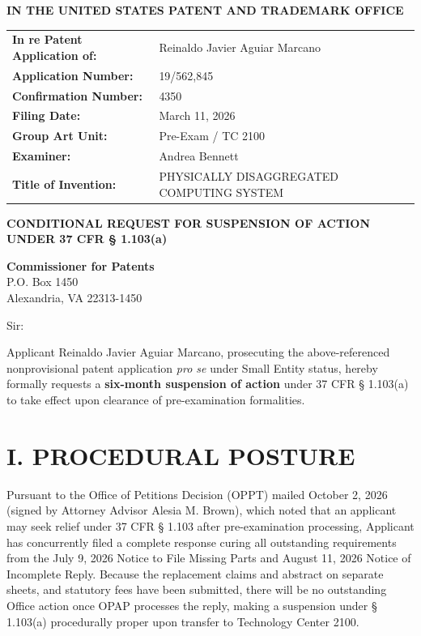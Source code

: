\documentclass[11pt,letterpaper]{article}
\begin{document}
\thispagestyle{empty}

\begin{center}
    \large\textbf{IN THE UNITED STATES PATENT AND TRADEMARK OFFICE} \\
\end{center}

\vspace{0.2cm}
\noindent\begin{tabular}{p{2.3in}p{4.0in}}
\textbf{In re Patent Application of:} & Reinaldo Javier Aguiar Marcano \\
\textbf{Application Number:} & 19/562,845 \\
\textbf{Confirmation Number:} & 4350 \\
\textbf{Filing Date:} & March 11, 2026 \\
\textbf{Group Art Unit:} & Pre-Exam / TC 2100 \\
\textbf{Examiner:} & Andrea Bennett \\
\textbf{Title of Invention:} & PHYSICALLY DISAGGREGATED COMPUTING SYSTEM \\
\end{tabular}

\vspace{0.4cm}
\begin{center}
    \textbf{\large CONDITIONAL REQUEST FOR SUSPENSION OF ACTION \\
    UNDER 37 CFR \S{} 1.103(a)}
\end{center}

\vspace{0.2cm}
\noindent\textbf{Commissioner for Patents} \\
\noindent P.O. Box 1450 \\
\noindent Alexandria, VA 22313-1450

\vspace{0.2cm}
\noindent Sir:

Applicant Reinaldo Javier Aguiar Marcano, prosecuting the above-referenced nonprovisional patent application \textit{pro se} under Small Entity status, hereby formally requests a \textbf{six-month suspension of action} under 37 CFR \S{} 1.103(a) to take effect upon clearance of pre-examination formalities.

\section*{I. PROCEDURAL POSTURE}

Pursuant to the Office of Petitions Decision (OPPT) mailed October 2, 2026 (signed by Attorney Advisor Alesia M. Brown), which noted that an applicant may seek relief under 37 CFR \S{} 1.103 after pre-examination processing, Applicant has concurrently filed a complete response curing all outstanding requirements from the July 9, 2026 Notice to File Missing Parts and August 11, 2026 Notice of Incomplete Reply. Because the replacement claims and abstract on separate sheets, and statutory fees have been submitted, there will be no outstanding Office action once OPAP processes the reply, making a suspension under \S{} 1.103(a) procedurally proper upon transfer to Technology Center 2100.
\end{document}

